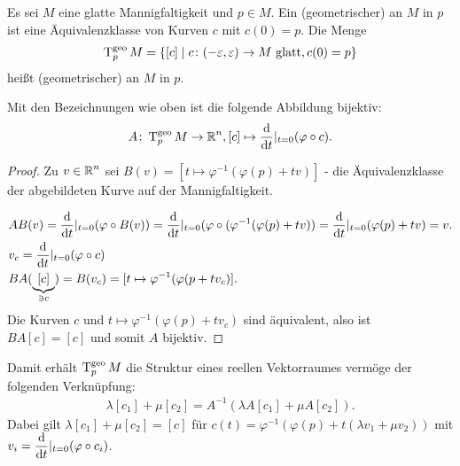 \begin{dfn}
  Es sei $M$ eine glatte Mannigfaltigkeit und $p \in M$. Ein (geometrischer)  an $M$ in $p$ ist eine Äquivalenzklasse von Kurven $c$ mit $c(0) = p$. Die Menge
  \begin{align*}
    \operatorname{T}_{p}^{\text{geo}}M = \{ [c] \mid c \colon (-\varepsilon,\varepsilon) \to M \text{ glatt}, c(0) = p\}
  \end{align*}
  heißt (geometrischer)  an $M$ in $p$.
\end{dfn}

\begin{bem}
  Mit den Bezeichnungen wie oben ist die folgende Abbildung bijektiv:
  \begin{align*}
    A \colon \operatorname{T}_p^{\text{geo}}M \to \operatorname{\mathbb{R}}^n, [c] \mapsto \dfrac{\mathrm{d} }{\mathrm{d} t}|_{t=0}(\varphi \circ c).
  \end{align*}
\end{bem}

\begin{proof}
  Zu $v \in \operatorname{\mathbb{R}}^n$ sei $B(v) = [t \mapsto \varphi^{-1}(\varphi(p) + tv)]$ - die Äquivalenzklasse der abgebildeten Kurve auf der Mannigfaltigkeit.


  \begin{align*}
    & A B(v) = \dfrac{\mathrm{d} }{\mathrm{d} t}|_{t=0}(\varphi \circ B(v)) = \dfrac{\mathrm{d} }{\mathrm{d} t}|_{t=0}(\varphi \circ (\varphi^{-1}(\varphi(p) + tv)) = \dfrac{\mathrm{d} }{\mathrm{d} t}|_{t=0}(\varphi(p) + tv) = v.\\
    & v_c = \dfrac{\mathrm{d} }{\mathrm{d} t}|_{t=0}(\varphi \circ c)\\
    & B A (\underbrace{[c]}_{\ni c}) = B(v_c) = [t \mapsto \varphi^{-1}(\varphi(p + tv_c)].
  \end{align*}
  Die Kurven $c$ und $t \mapsto \varphi^{-1}(\varphi(p) + tv_c)$ sind äquivalent, also ist $B A[c] = [c]$ und somit $A$ bijektiv.
\end{proof}

Damit erhält $\operatorname{T}_p^{\text{geo}}M$ die Struktur eines reellen Vektorraumes vermöge der folgenden Verknüpfung:
\begin{align*}
  \lambda[c_1] + \mu[c_2] = A^{-1}(\lambda A[c_1]+ \mu A[c_2]).
\end{align*}
Dabei gilt $\lambda[c_1]+\mu[c_2] = [c]$ für $c(t) = \varphi^{-1}(\varphi(p) + t(\lambda v_1 + \mu v_2))$ mit $v_i = \dfrac{\mathrm{d} }{\mathrm{d} t}|_{t=0}(\varphi \circ c_i)$.

